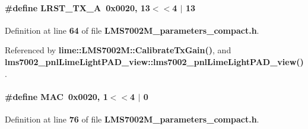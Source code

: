 \paragraph[{L\+R\+S\+T\+\_\+\+T\+X\+\_\+A}]{\setlength{\rightskip}{0pt plus 5cm}\#define L\+R\+S\+T\+\_\+\+T\+X\+\_\+A~0x0020, 13$<$$<$4 $\vert$  13}\label{LMS7002M__parameters__compact_8h_a46232c8edc73edf1675c134c54c20077}


Definition at line {\bf 64} of file {\bf L\+M\+S7002\+M\+\_\+parameters\+\_\+compact.\+h}.



Referenced by {\bf lime\+::\+L\+M\+S7002\+M\+::\+Calibrate\+Tx\+Gain()}, and {\bf lms7002\+\_\+pnl\+Lime\+Light\+P\+A\+D\+\_\+view\+::lms7002\+\_\+pnl\+Lime\+Light\+P\+A\+D\+\_\+view()}.

\paragraph[{M\+AC}]{\setlength{\rightskip}{0pt plus 5cm}\#define M\+AC~0x0020, 1$<$$<$4 $\vert$  0}\label{LMS7002M__parameters__compact_8h_a4d942614e0ca30372d649e643d229f90}


Definition at line {\bf 76} of file {\bf L\+M\+S7002\+M\+\_\+parameters\+\_\+compact.\+h}.



